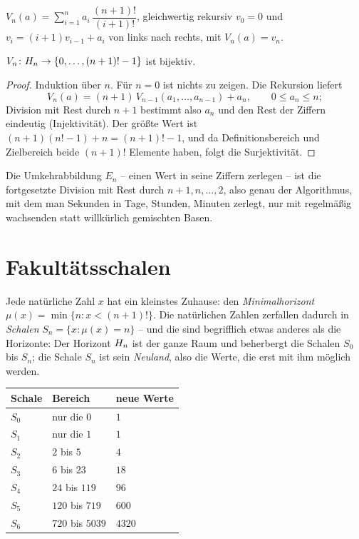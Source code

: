 \begin{definition}
$V_n(a)=\sum_{i=1}^{n}a_i\,\dfrac{(n+1)!}{(i+1)!}$, gleichwertig
rekursiv $v_0=0$ und $v_i=(i{+}1)v_{i-1}+a_i$ von links nach
rechts, mit $V_n(a)=v_n$.
\end{definition}

\begin{satz}[Register S1]
$V_n\colon H_{n}\to\{0,\ldots,(n+1)!-1\}$ ist bijektiv.
\end{satz}

\begin{proof}
Induktion über $n$. Für $n=0$ ist nichts zu zeigen. Die Rekursion
liefert
\[
V_n(a)=(n{+}1)\,V_{n-1}(a_1,\ldots,a_{n-1})+a_n,
\qquad 0\le a_n\le n;
\]
Division mit Rest durch $n+1$ bestimmt also $a_n$
und den Rest der Ziffern eindeutig (Injektivität). Der größte Wert
ist $(n{+}1)(n!-1)+n=(n{+}1)!-1$, und da Definitionsbereich und
Zielbereich beide $(n+1)!$ Elemente haben, folgt die Surjektivität.
\end{proof}

Die Umkehrabbildung $E_n$ -- einen Wert in seine Ziffern zerlegen --
ist die fortgesetzte Division mit Rest durch $n{+}1, n, \ldots, 2$,
also genau der Algorithmus, mit dem man Sekunden in Tage, Stunden,
Minuten zerlegt, nur mit regelmäßig wachsenden statt willkürlich
gemischten Basen.

\section{Fakultätsschalen}

Jede natürliche Zahl $x$ hat ein kleinstes Zuhause: den
\emph{Minimalhorizont} $\mu(x)=\min\{n:x<(n+1)!\}$. Die natürlichen
Zahlen zerfallen dadurch in \emph{Schalen} $S_n=\{x:\mu(x)=n\}$ --
und die sind begrifflich etwas anderes als die Horizonte: Der
Horizont $H_{n}$ ist der ganze Raum und beherbergt die Schalen
$S_0$ bis $S_n$; die Schale $S_n$ ist sein \emph{Neuland}, also die
Werte, die erst mit ihm möglich werden.

\begin{center}
\begin{tabular}{lll}
Schale & Bereich & neue Werte\\
\hline
$S_0$ & nur die $0$ & $1$\\
$S_1$ & nur die $1$ & $1$\\
$S_2$ & $2$ bis $5$ & $4$\\
$S_3$ & $6$ bis $23$ & $18$\\
$S_4$ & $24$ bis $119$ & $96$\\
$S_5$ & $120$ bis $719$ & $600$\\
$S_6$ & $720$ bis $5039$ & $4320$\\
\end{tabular}
\end{center}

